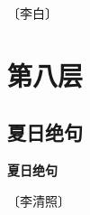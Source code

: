 \documentclass[12pt,UTF-8,openany,fontset=none]{ctexbook}
\begin{document}
\begin{center}
    \vspace{10pt}
    
    \begin{large}
        
        〔李白〕
        
    \end{large}
    
    \vspace{8pt}
    
    \begin{huge}
        
        \phantom{。}

        \phantom{。}
        
        \phantom{。}

        \phantom{。}
        
    \end{huge}
    
\end{center}

\vspace{8pt}
\clearpage


\chapter{第八层}
\clearpage

\section{夏日绝句}



\begin{center}
    {\bfseries 夏日绝句}
\end{center}

\begin{center}
    \vspace{10pt}
    
    \begin{large}
        
        〔李清照〕
        
    \end{large}
    
    \vspace{8pt}
    
    \begin{huge}
        
        \phantom{。}

        \phantom{。}
        
        \phantom{。}

        \phantom{。}
        
    \end{huge}
    
\end{center}
\end{document}

